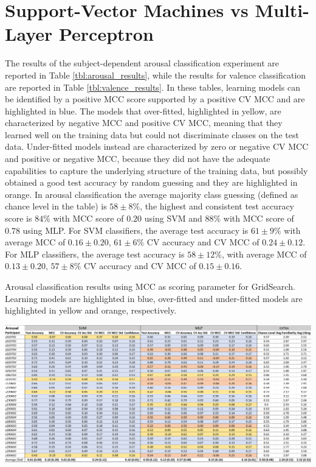\section{Support-Vector Machines vs Multi-Layer Perceptron}
\label{sec:svm_mlp}
The results of the subject-dependent arousal classification experiment are reported in Table \ref{tbl:arousal_results}, while the results for valence classification are reported in Table \ref{tbl:valence_results}. In these tables, learning models can be identified by a positive \ac{MCC} score supported by a positive \ac{CV MCC} and are highlighted in blue. The models that over-fitted, highlighted in yellow, are characterized by negative \ac{MCC} and positive \ac{CV MCC}, meaning that they learned well on the training data but could not discriminate classes on the test data. Under-fitted models instead are characterized by zero or negative \ac{CV MCC} and positive or negative \ac{MCC}, because they did not have the adequate capabilities to capture the underlying structure of the training data, but possibly obtained a good test accuracy by random guessing and they are highlighted in orange.  In arousal classification the average majority class guessing (defined as chance level in the table) is \(58\pm8\%\), the highest and consistent test accuracy score is \(84\%\) with \ac{MCC} score of \(0.20\) using \ac{SVM} and \(88\%\) with \ac{MCC} score of \(0.78\) using \ac{MLP}. For \ac{SVM} classifiers, the average test accuracy is \( 61\pm9\%\) with average MCC of \(0.16\pm0.20\), \(61\pm6\% \) \ac{CV} accuracy and \ac{CV MCC} of \(0.24\pm0.12.\) For \ac{MLP} classifiers, the average test accuracy is \(58\pm12\%\), with average MCC of \(0.13\pm0.20\), \(57\pm8\% \) \ac{CV} accuracy and \ac{CV MCC} of \(0.15\pm0.16\). 

\begin{table}[h!]
  \caption{Arousal classification results using MCC as scoring parameter for GridSearch. Learning models are highlighted in blue, over-fitted and under-fitted models are highlighted in yellow and orange, respectively.}
  \label{tbl:arousal_results}
  \includegraphics[width=\linewidth]{img/results/arousal_results.png}
\end{table}

